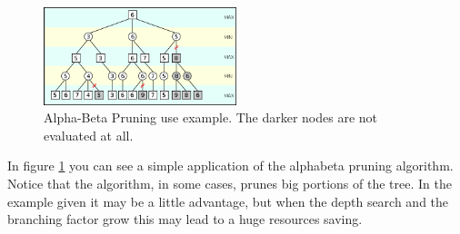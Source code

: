 \begin{figure}[htbp] \label{fig:alphabeta_example}
  \centering
    \includegraphics[width=0.5\textwidth]{images/alphabeta_pruning.png}
  \caption{Alpha-Beta Pruning use example. The darker nodes are not evaluated at all.}
\end{figure}

In figure \ref{fig:alphabeta_example} you can see a simple application of the alphabeta pruning algorithm. Notice that the algorithm, in some cases, prunes big portions of the tree. In the example given it may be a little advantage, but when the depth search and the branching factor grow this may lead to a huge resources saving.
